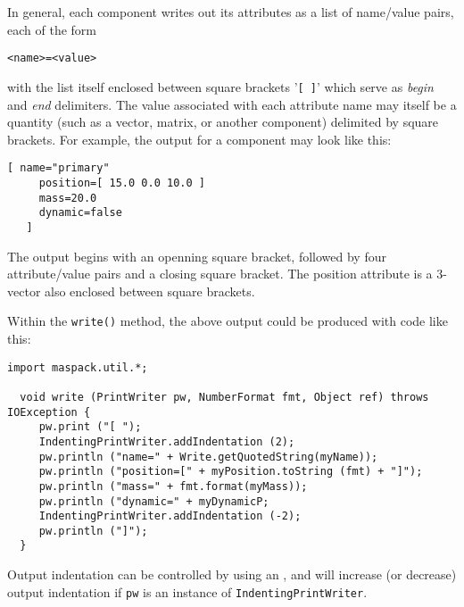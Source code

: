 \documentclass{article}
\begin{document}
In general, each component writes out its attributes as a list
of name/value pairs, each of the form
\begin{lstlisting}[]
  <name>=<value>
\end{lstlisting}
with the list itself enclosed between square brackets '{\tt [ ]}' which
serve as {\it begin} and {\it end} delimiters. The value associated with each
attribute name may itself be a quantity (such as a vector, matrix, or
another component) delimited by square brackets. For example, the
output for a  component
may look like this:
\begin{lstlisting}[]
   [ name="primary"
     position=[ 15.0 0.0 10.0 ]
     mass=20.0
     dynamic=false
   ]
\end{lstlisting}
The output begins with an openning square bracket, followed by four
attribute/value pairs and a closing square bracket. The position
attribute is a 3-vector also enclosed between square brackets.

Within the {\tt write()} method, the above output could be produced
with code like this:
\begin{lstlisting}[]
  import maspack.util.*;

  void write (PrintWriter pw, NumberFormat fmt, Object ref) throws IOException {
     pw.print ("[ ");
     IndentingPrintWriter.addIndentation (2); 
     pw.println ("name=" + Write.getQuotedString(myName));
     pw.println ("position=[" + myPosition.toString (fmt) + "]");
     pw.println ("mass=" + fmt.format(myMass));
     pw.println ("dynamic=" + myDynamicP;
     IndentingPrintWriter.addIndentation (-2);
     pw.println ("]");
  }
\end{lstlisting}
Output indentation can be controlled by using an
, and
will increase (or decrease) output indentation if
{\tt pw} is an instance of {\tt IndentingPrintWriter}.
\end{document}
